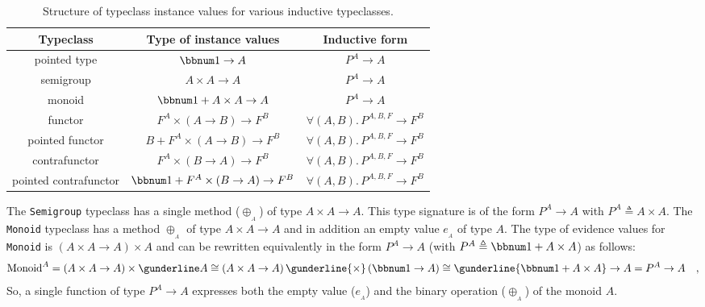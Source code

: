 \begin{table}
\begin{centering}
\begin{tabular}{|c|c|c|}
\hline 
\textbf{\small{}Typeclass} & \textbf{\small{}Type of instance values} & \textbf{\small{}Inductive form}\tabularnewline
\hline 
\hline 
{\small{}pointed type} & {\small{}$\bbnum 1\rightarrow A$} & {\small{}$P^{A}\rightarrow A$}\tabularnewline
\hline 
{\small{}semigroup} & {\small{}$A\times A\rightarrow A$} & {\small{}$P^{A}\rightarrow A$}\tabularnewline
\hline 
{\small{}monoid} & {\small{}$\bbnum 1+A\times A\rightarrow A$} & {\small{}$P^{A}\rightarrow A$}\tabularnewline
\hline 
{\small{}functor} & {\small{}$F^{A}\times\left(A\rightarrow B\right)\rightarrow F^{B}$} & {\small{}$\forall(A,B).\,P^{A,B,F}\rightarrow F^{B}$}\tabularnewline
\hline 
{\small{}pointed functor} & {\small{}$B+F^{A}\times\left(A\rightarrow B\right)\rightarrow F^{B}$} & {\small{}$\forall(A,B).\,P^{A,B,F}\rightarrow F^{B}$}\tabularnewline
\hline 
{\small{}contrafunctor} & {\small{}$F^{A}\times(B\rightarrow A)\rightarrow F^{B}$} & {\small{}$\forall(A,B).\,P^{A,B,F}\rightarrow F^{B}$}\tabularnewline
\hline 
{\small{}pointed contrafunctor} & {\small{}$\bbnum 1+F^{A}\times\left(B\rightarrow A\right)\rightarrow F^{B}$} & {\small{}$\forall(A,B).\,P^{A,B,F}\rightarrow F^{B}$}\tabularnewline
\hline 
\end{tabular}
\par\end{centering}
\caption{Structure of typeclass instance values for various inductive typeclasses.\label{tab:Types-of-typeclass-instance-values}}
\end{table}

The \lstinline!Semigroup! typeclass has a single method ($\oplus_{_{A}}$)
of type $A\times A\rightarrow A$. This type signature is of the form
$P^{A}\rightarrow A$ with $P^{A}\triangleq A\times A$. The \lstinline!Monoid!
typeclass has a method $\oplus_{_{A}}$ of type $A\times A\rightarrow A$
and in addition an empty value $e_{_{A}}$ of type $A$. The type
of evidence values for \lstinline!Monoid! is $(A\times A\rightarrow A)\times A$
and can be rewritten equivalently in the form $P^{A}\rightarrow A$
(with $P^{A}\triangleq\bbnum 1+A\times A$) as follows:
\[
\text{Monoid}^{A}=\left(A\times A\rightarrow A\right)\times\gunderline A\cong\left(A\times A\rightarrow A\right)\gunderline{\times}\,(\bbnum 1\rightarrow A)\cong\gunderline{\bbnum 1+A\times A}\rightarrow A=P^{A}\rightarrow A\quad,
\]
So, a single function of type $P^{A}\rightarrow A$ expresses both
the empty value ($e_{_{A}}$) and the binary operation ($\oplus_{_{A}}$)
of the monoid $A$.

